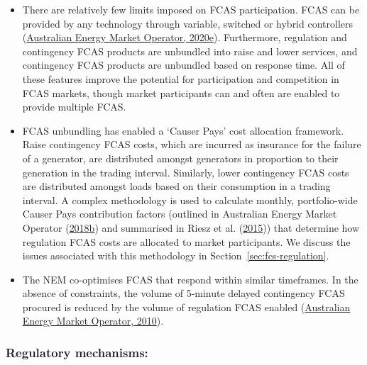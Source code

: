\documentclass[12pt,a4paper,]{report}
\providecommand{\tightlist}{%
  \setlength{\itemsep}{0pt}\setlength{\parskip}{0pt}}
\begin{document}
\begin{itemize}
\tightlist
\item
  There are relatively few limits imposed on FCAS participation. FCAS
  can be provided by any technology through variable, switched or hybrid
  controllers
  (\protect\hyperlink{ref-australianenergymarketoperatorMarketAncillaryService2020a}{Australian
  Energy Market Operator, 2020e}). Furthermore, regulation and
  contingency FCAS products are unbundled into raise and lower services,
  and contingency FCAS products are unbundled based on response time.
  All of these features improve the potential for participation and
  competition in FCAS markets, though market participants can and often
  are enabled to provide multiple FCAS.
\item
  FCAS unbundling has enabled a `Causer Pays' cost allocation framework.
  Raise contingency FCAS costs, which are incurred as insurance for the
  failure of a generator, are distributed amongst generators in
  proportion to their generation in the trading interval. Similarly,
  lower contingency FCAS costs are distributed amongst loads based on
  their consumption in a trading interval. A complex methodology is used
  to calculate monthly, portfolio-wide Causer Pays contribution factors
  (outlined in Australian Energy Market Operator
  (\protect\hyperlink{ref-australianenergymarketoperatorRegulationFCASContribution2018a}{2018b})
  and summarised in Riesz et al.
  (\protect\hyperlink{ref-rieszFrequencyControlAncillary2015}{2015}))
  that determine how regulation FCAS costs are allocated to market
  participants. We discuss the issues associated with this methodology
  in Section~\ref{sec:fcs-regulation}.
\item
  The NEM co-optimises FCAS that respond within similar timeframes. In
  the absence of constraints, the volume of 5-minute delayed contingency
  FCAS procured is reduced by the volume of regulation FCAS enabled
  (\protect\hyperlink{ref-australianenergymarketoperatorConstraintFormulationGuidelines2010}{Australian
  Energy Market Operator, 2010}).
\end{itemize}

\hypertarget{regulatory-mechanisms}{%
\subsubsection{Regulatory mechanisms:}\label{regulatory-mechanisms}}
\end{document}
